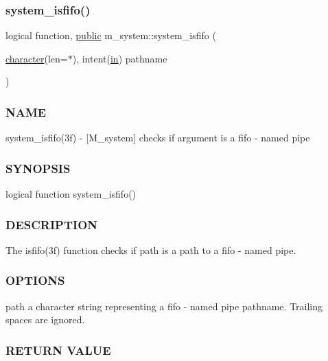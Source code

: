 \subsubsection{\texorpdfstring{system\+\_\+isfifo()}{system\_isfifo()}}
{\footnotesize\ttfamily logical function, \hyperlink{M__stopwatch_83_8txt_a2f74811300c361e53b430611a7d1769f}{public} m\+\_\+system\+::system\+\_\+isfifo (\begin{DoxyParamCaption}\item[{\hyperlink{option__stopwatch_83_8txt_abd4b21fbbd175834027b5224bfe97e66}{character}(len=$\ast$), intent(\hyperlink{M__journal_83_8txt_afce72651d1eed785a2132bee863b2f38}{in})}]{pathname }\end{DoxyParamCaption})}



\subsubsection*{N\+A\+ME}

system\+\_\+isfifo(3f) -\/ \mbox{[}M\+\_\+system\mbox{]} checks if argument is a fifo -\/ named pipe 

\subsubsection*{S\+Y\+N\+O\+P\+S\+IS}

\begin{DoxyVerb}logical function system_isfifo()
\end{DoxyVerb}


\subsubsection*{D\+E\+S\+C\+R\+I\+P\+T\+I\+ON}

The isfifo(3f) function checks if path is a path to a fifo -\/ named pipe.

\subsubsection*{O\+P\+T\+I\+O\+NS}

path a character string representing a fifo -\/ named pipe pathname. Trailing spaces are ignored.

\subsubsection*{R\+E\+T\+U\+RN V\+A\+L\+UE}

